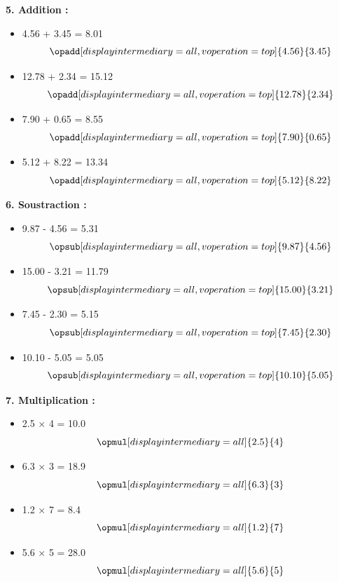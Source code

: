 \documentclass{article}
\begin{document}
\begin{tcolorbox}[colback=green!10!white, colframe=green!75!black, sharp corners=south, boxrule=0.8mm, title=Corrections]
    \textbf{5. Addition :}
    \begin{itemize}
        \item 4.56 + 3.45 = 8.01
        \[
        \opadd[displayintermediary=all,voperation=top]{4.56}{3.45}
        \]
        \item 12.78 + 2.34 = 15.12
        \[
        \opadd[displayintermediary=all,voperation=top]{12.78}{2.34}
        \]
        \item 7.90 + 0.65 = 8.55
        \[
        \opadd[displayintermediary=all,voperation=top]{7.90}{0.65}
        \]
        \item 5.12 + 8.22 = 13.34
        \[
        \opadd[displayintermediary=all,voperation=top]{5.12}{8.22}
        \]
    \end{itemize}
\end{tcolorbox}

\begin{tcolorbox}[colback=green!10!white, colframe=green!75!black, sharp corners=south, boxrule=0.8mm, title=Corrections]
    \textbf{6. Soustraction :}
    \begin{itemize}
        \item 9.87 - 4.56 = 5.31
        \[
        \opsub[displayintermediary=all,voperation=top]{9.87}{4.56}
        \]
        \item 15.00 - 3.21 = 11.79
        \[
        \opsub[displayintermediary=all,voperation=top]{15.00}{3.21}
        \]
        \item 7.45 - 2.30 = 5.15
        \[
        \opsub[displayintermediary=all,voperation=top]{7.45}{2.30}
        \]
        \item 10.10 - 5.05 = 5.05
        \[
        \opsub[displayintermediary=all,voperation=top]{10.10}{5.05}
        \]
    \end{itemize}

    \textbf{7. Multiplication :}
    \begin{itemize}
        \item 2.5 × 4 = 10.0
        \[
        \opmul[displayintermediary=all]{2.5}{4}
        \]
        \item 6.3 × 3 = 18.9
        \[
        \opmul[displayintermediary=all]{6.3}{3}
        \]
        \item 1.2 × 7 = 8.4
        \[
        \opmul[displayintermediary=all]{1.2}{7}
        \]
        \item 5.6 × 5 = 28.0
        \[
        \opmul[displayintermediary=all]{5.6}{5}
        \]
    \end{itemize}
\end{tcolorbox}
\end{document}
